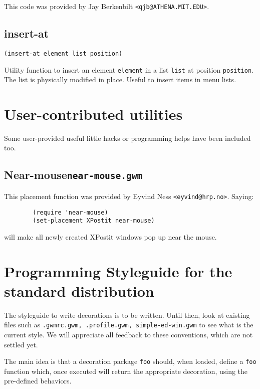 This code was provided by Jay Berkenbilt \verb|<qjb@ATHENA.MIT.EDU>|.

\subsection{insert-at}
\label{insert-at}

{\usagefont\begin{verbatim}
(insert-at element list position)
\end{verbatim}}\usageupspace

Utility function to insert an element \verb"element" in a list \verb"list" at
position \verb"position". The  list is physically modified in place. Useful to
insert items in menu lists.

\section{User-contributed utilities}
\label{user-contrib-utils}

Some user-provided useful little hacks or programming helps have been
included too.

\subsection{Near-mouse\hfill{\tt near-mouse.gwm}}
\label{near-mouse.gwm}

This placement function was provided by Eyvind Ness \verb|<eyvind@hrp.no>|.
Saying:
{\exemplefont\begin{verbatim}
        (require 'near-mouse)
        (set-placement XPostit near-mouse)
\end{verbatim}}
will make all newly created XPostit windows pop up near the mouse.

\section{Programming Styleguide for the standard distribution}
\label{standard-styleguide}

The styleguide to write decorations is to be written. Until then, look at
existing files such as {\tt .gwmrc.gwm, .profile.gwm, simple-ed-win.gwm} to
see what is the current style. We will appreciate all feedback to these
conventions, which are not settled yet.

The main idea is that a decoration package \verb"foo" should, when loaded,
define a \verb"foo" function which, once executed will return the appropriate
decoration, using the pre-defined behaviors.

